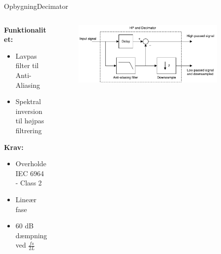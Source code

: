 \begin{frame}{Opbygning}{Decimator}

\begin{columns}
  \begin{column}{0.4\textwidth}
  \textbf{Funktionalitet:}
\begin{itemize}
\item Lavpas filter til Anti-Aliasing
\item Spektral inversion til højpas filtrering 
\end{itemize}

\textbf{Krav:}
\begin{itemize}
\item Overholde IEC 6964 - Class 2
\item Lineær fase
\item 60 dB dæmpning ved $\frac{fs}{2L}$
\end{itemize}
  \end{column}
  \begin{column}{0.6\textwidth}
\begin{figure}
\centering
\includegraphics[width=0.9\textwidth]{designRealDecimator}
\end{figure}
  \end{column}
\end{columns}
\end{frame}


